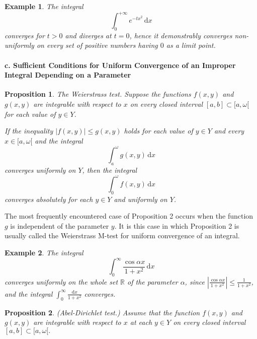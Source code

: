 \documentclass[a4paper,12pt]{article}
\newtheorem{example}{Example}             %
\newtheorem{proposition}{Proposition}
\begin{document}
\begin{CJK}{UTF8}{gbsn}
    \begin{example}
        The integral 
        \[
            \int_0^{+\infty}e^{-tx^2}\, \mathrm{d}x
            \]
        converges for $t > 0$ and diverges at $t = 0$, hence it demonstrably converges 
        non-uniformly on every set of positive numbers having $0$ as a limit point.
    \end{example}

    \paragraph{\textbf{c. Sufficient Conditions for Uniform Convergence of 
    an Improper Integral Depending on a Parameter}}

    \begin{proposition}{The Weierstrass test.}
        Suppose the functions $f(x,y)$ and $g(x,y)$ are integrable with respect to $x$
        on every closed interval $[a,b] \subset [a,\omega[$ for each value of $y \in Y$.
        
        If the inequality $\left | f(x,y) \right | \le g(x,y) $ holds for each value 
        of $y \in Y$ and every $x \in [a,\omega[$ and the integral 
        \[
            \int_a^{\omega}g(x,y)\,\mathrm{d}x
        \]
        converges uniformly on $Y$, then the integral 
        \[
            \int_0^{\omega}f(x,y)\,\mathrm{d}x
        \]
        converges absolutely for each $y \in Y$ and uniformly on $Y$.
    \end{proposition}

    The most frequently encountered case of Proposition 2 occurs when the function 
    $g$ is independent of the parameter $y$. It is this case in which Proposition 2 
    is usually called the Weierstrass M-test for uniform convergence of an integral.

    \begin{example}
        The integral 
        \[
            \int_0^{\infty}\frac{\cos \alpha x}{1 + x^2}\, \mathrm{d}x
        \]
        converges uniformly on the whole set $\mathbb{R}$ of the parameter $\alpha$,
        since $\left |\frac{\cos \alpha x}{1 + x^2}\right | \le \frac{1}{1 + x^2}$, and the integral 
        $\int_0^{\infty}\frac{\mathrm{d}x}{1 + x^2}$ converges.
    \end{example}

    \begin{proposition}{(\emph{Abel-Dirichlet test.})}
        Assume that the function $f(x,y)$ and $g(x,y)$ are integrable with respect to 
        $x$ at each $y \in Y$ on every closed interval $[a,b]\subset[a,\omega[.$


\end{proposition}
\end{CJK}
\end{document}
